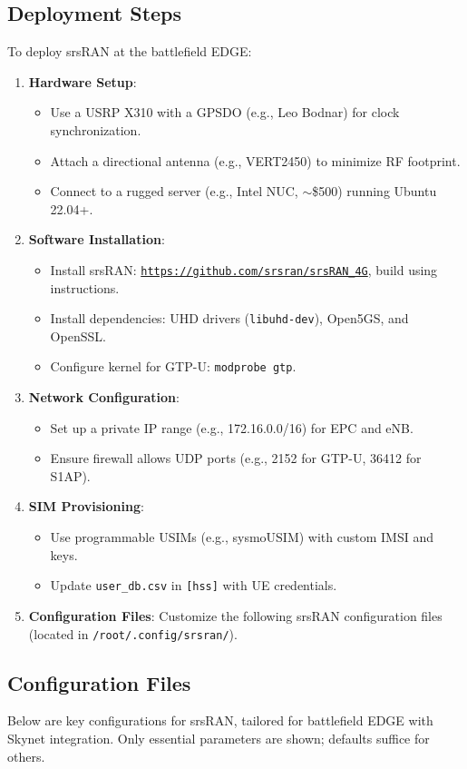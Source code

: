 \documentclass{article}
\begin{document}
\subsection{Deployment Steps}
To deploy srsRAN at the battlefield EDGE:
\begin{enumerate}
\item \textbf{Hardware Setup}:
\begin{itemize}
\item Use a USRP X310 with a GPSDO (e.g., Leo Bodnar) for clock synchronization.
\item Attach a directional antenna (e.g., VERT2450) to minimize RF footprint.
\item Connect to a rugged server (e.g., Intel NUC, $\sim$\$500) running Ubuntu 22.04+.
\end{itemize}
\item \textbf{Software Installation}:
\begin{itemize}
\item Install srsRAN: \texttt{\url{https://github.com/srsran/srsRAN_4G}}, build using instructions.
\item Install dependencies: UHD drivers (\texttt{libuhd-dev}), Open5GS, and OpenSSL.
\item Configure kernel for GTP-U: \texttt{modprobe gtp}.
\end{itemize}
\item \textbf{Network Configuration}:
\begin{itemize}
\item Set up a private IP range (e.g., 172.16.0.0/16) for EPC and eNB.
\item Ensure firewall allows UDP ports (e.g., 2152 for GTP-U, 36412 for S1AP).
\end{itemize}
\item \textbf{SIM Provisioning}:
\begin{itemize}
\item Use programmable USIMs (e.g., sysmoUSIM) with custom IMSI and keys.
\item Update \texttt{user\_db.csv} in \texttt{[hss]} with UE credentials.
\end{itemize}
\item \textbf{Configuration Files}: Customize the following srsRAN configuration files (located in \texttt{/root/.config/srsran/}).
\end{enumerate}

\newpage
\subsection{Configuration Files}
Below are key configurations for srsRAN, tailored for battlefield EDGE with Skynet integration.
Only essential parameters are shown; defaults suffice for others.
\end{document}
